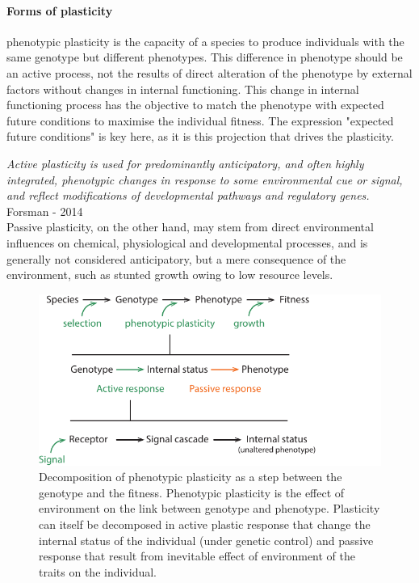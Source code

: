 \paragraph{Forms of plasticity}
phenotypic plasticity is the capacity of a species to produce individuals with the same genotype but different phenotypes. This difference in phenotype should be an active process, not the results of direct alteration of the phenotype by external factors without changes in internal functioning. This change in internal functioning process has the objective  to match the phenotype with expected future conditions to maximise the individual fitness. The expression "expected future conditions" is key here, as it is this projection that drives the plasticity.

\textit{Active plasticity is used for predominantly anticipatory, and often highly integrated, phenotypic changes in response to some environmental cue or signal, and reflect modifications of developmental pathways and regulatory genes.} Forsman - 2014\\


Passive plasticity, on the other hand, may stem from direct environmental influences on chemical, physiological and developmental processes, and is generally not considered anticipatory, but a mere consequence of the environment, such as stunted growth owing to low resource levels.\\


\begin{figure}
    \includegraphics[width=1\linewidth]{./2_PP/Figures/Concepts/genotype_to_phenotype.pdf}
  \caption[Decomposition of plastic response]{Decomposition of phenotypic plasticity as a step between the genotype and the fitness. Phenotypic plasticity is the effect of environment on the link between genotype and phenotype. Plasticity can itself be decomposed in active plastic response that change the internal status of the individual (under genetic control) and passive response that result from inevitable effect of environment of the traits on the individual.}
  \label{fg:PCA_calibration}
\end{figure}

